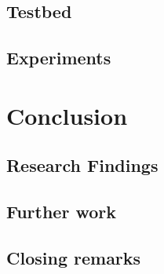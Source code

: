 \documentclass[UKenglish]{ifimaster}
\begin{document}
\section{Testbed}
\section{Experiments}

\chapter{Conclusion}                    
\section{Research Findings}
\section{Further work}
\section{Closing remarks}

\backmatter{}
\printbibliography
\end{document}
